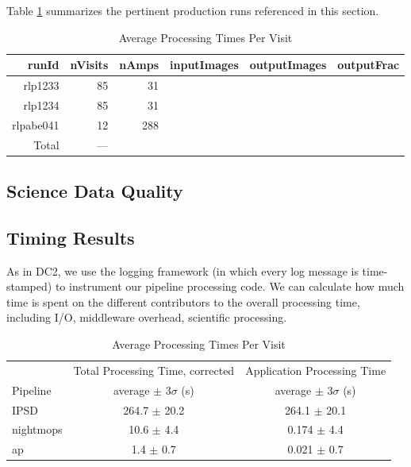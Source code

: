 Table \ref{tbl:runsummary} summarizes the pertinent production runs
referenced in this section.

\begin{table}[htbp]
\centering
\caption{Average Processing Times Per Visit
\label{tbl:runsummary}}
\vspace{\baselineskip}
\begin{tabular}{ | r | r | r | r | r | r |}
\hline\hline
runId & nVisits & nAmps & inputImages & outputImages & outputFrac \\ \hline
rlp1233 & 85  & 31 &  &  &  \\ \hline
rlp1234 & 85  & 31 &  &  &  \\ \hline
rlpabe041 & 12  & 288 &  &  &  \\ \hline
Total   & --- &    &  &  &  \\ \hline
\end{tabular}
\end{table}

\subsection{Science Data Quality}

\subsection{Timing Results}
\label{sec:timing}

As in DC2, we use the logging framework (in which every log message is
time-stamped) to instrument our pipeline processing code.  We can
calculate how much time is spent on the different contributors to the
overall processing time, including I/O, middleware overhead,
scientific processing.  

\begin{table}[htbp]
\begin{center}
\caption{Average Processing Times Per Visit
\label{tbl:visitstats}}
\vspace{\baselineskip}
\begin{tabular}{ l | c | c |}
\hline\hline
          & Total Processing Time, corrected
          & Application Processing Time \\ 
Pipeline  & average $\pm$  $3\sigma$ (s) & average $\pm$ $3\sigma$ (s) \\ \hline
IPSD      & 264.7 $\pm$ 20.2 & 264.1 $\pm$ 20.1  \\ 
nightmops & 10.6  $\pm$  4.4 & 0.174 $\pm$  4.4  \\ 
ap        & 1.4   $\pm$  0.7 & 0.021 $\pm$  0.7  \\ \hline
\hline
\end{tabular}

\end{center}
\end{table}


